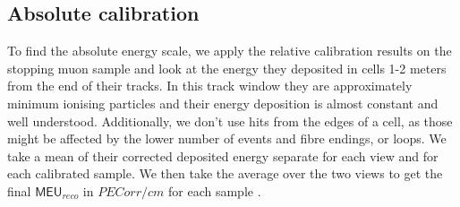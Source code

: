 \documentclass[12pt,a4paper]{article}
\begin{document}


\subsection{Absolute calibration}

To find the absolute energy scale, we apply the relative calibration results on the stopping muon sample and look at the energy they deposited in cells 1-2 meters from the end of their tracks. In this track window they are approximately minimum ionising particles and their energy deposition is almost constant and well understood. Additionally, we don't use hits from the edges of a cell, as those might be affected by the lower number of events and fibre endings, or loops. We take a mean of their corrected deposited energy separate for each view and for each calibrated sample. We then take the average over the two views to get the final $\textsf{MEU}_{reco}$ in $\unit{PECorr/cm}$ for each sample \cite{NOVA-doc-13579-FACalorimetricEnergyScale}.
 
\end{document}

